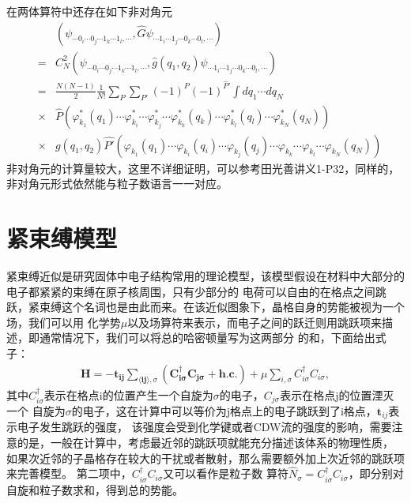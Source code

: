 \documentclass[12pt, a4paper, oneside, UTF8]{ctexbook}
\begin{document}
在两体算符中还存在如下非对角元
\begin{eqnarray}
    &&(\psi_{\cdots 0_i\cdots 0_j \cdots 1_k \cdots 1_l,\cdots},\hat{G}\psi_{\cdots 1_i\cdots 1_j \cdots 0_k \cdots 0_l,\cdots})\\\nonumber
    &=&C_N^2(\psi_{\cdots 0_i\cdots 0_j \cdots 1_k \cdots 1_l,\cdots},\hat{g}(q_1,q_2)\psi_{\cdots 1_i\cdots 1_j \cdots 0_k \cdots 0_l,\cdots})\\\nonumber
    &=&\frac{N(N-1)}{2}\frac{1}{N!}\sum_P\sum_{P'}(-1)^{\hat{P}}(-1)^{\hat{P}'}\int dq_1 \cdots dq_N\\\nonumber
    &\times&\hat{P}\left(\varphi^*_{k_1}(q_1)\cdots \boxed{\varphi^*_{k_i}} \cdots \boxed{\varphi^*_{k_j}}\cdots\varphi^*_{k_k}(q_k)\cdots \varphi^*_{k_l}(q_l)\cdots\varphi^*_{k_N}(q_N)\right)\\\nonumber
    &\times&g(q_1,q_2)\hat{P'}\left(\varphi_{k_1}(q_1)\cdots \varphi_{k_i}(q_i) \cdots \varphi_{k_j}(q_j)\cdots \boxed{\varphi_{k_k}}\cdots \boxed{\varphi_{k_l}}\cdots \varphi_{k_N}(q_N)\right)
\end{eqnarray}
非对角元的计算量较大，这里不详细证明，可以参考田光善讲义1-P32，同样的，非对角元形式依然能与粒子数语言一一对应。

\chapter{紧束缚模型}
紧束缚近似是研究固体中电子结构常用的理论模型，该模型假设在材料中大部分的电子都紧紧的束缚在原子核周围，只有少部分的
电荷可以自由的在格点之间跳跃，紧束缚这个名词也是由此而来。在该近似图象下，晶格自身的势能被视为一个场，我们可以用
化学势$\mu$以及场算符来表示，而电子之间的跃迁则用跳跃项来描述，即通常情况下，我们可以将总的哈密顿量写为这两部分
的和，下面给出式子：
\begin{eqnarray}
	\mathbf{H}=-\mathbf{t_{ij}}\sum_{\langle\mathbf{ij}\rangle,\sigma}(\mathbf{C^{\dag}_{i\sigma}C_{j\sigma}+h.c.})
	+\mu\sum_{i,\sigma} C^{\dag}_{i\sigma}C_{i\sigma},
\end{eqnarray}
其中$C^{\dag}_{i\sigma}$表示在格点i的位置产生一个自旋为$\sigma$的电子，$C_{j\sigma}$表示在格点j的位置湮灭一个
自旋为$\sigma$的电子，这在计算中可以等价为j格点上的电子跳跃到了i格点，$\mathbf{t}_{ij}$表示电子发生跳跃的强度，
该强度会受到化学键或者CDW流的强度的影响，需要注意的是，一般在计算中，考虑最近邻的跳跃项就能充分描述该体系的物理性质，
如果次近邻的子晶格存在较大的干扰或者散射，那么需要额外加上次近邻的跳跃项来完善模型。
第二项中，$C^{\dag}_{i\sigma}C_{i\sigma}$又可以看作是粒子数
算符$\hat{N}_{\sigma}=C^{\dag}_{i\sigma}C_{i\sigma}$，即分别对自旋和粒子数求和，得到总的势能。
\end{document}
